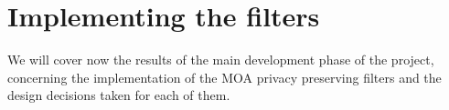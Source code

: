 \chapter{Implementing the filters} %
\label{Chapter6ImplementingFilters} %


We will cover now the results of the main development phase of the project, concerning the implementation of the MOA privacy preserving filters and the design decisions taken for each of them.








